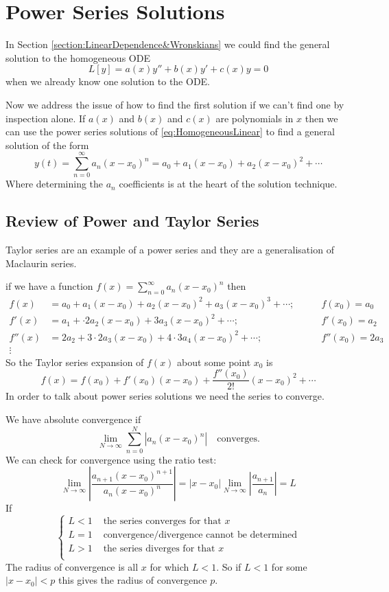\documentclass{article}
\theoremstyle{plain}
\theoremstyle{definition}
\numberwithin{equation}{section}
\begin{document}
\section{Power Series Solutions}

In Section \ref{section:LinearDependence&Wronskians} we could find the general solution to the homogeneous ODE
\begin{equation}\label{eq:HomogeneousLinear}
    L[y] = a(x)y'' + b(x)y' + c(x)y = 0
\end{equation}
when we already know one solution to the ODE.

Now we address the issue of how to find the first solution if we can't find one by inspection alone. If $a(x)$ and $b(x)$ and $c(x)$ are polynomials in $x$ then we can use the power series solutions of \eqref{eq:HomogeneousLinear} to find a general solution of the form
\[
    y(t) = \sum_{n=0}^{\infty}a_n (x-x_0)^n = a_0 + a_1(x-x_0) + a_2(x-x_0)^2 + \cdots
\]
Where determining the $a_n$ coefficients is at the heart of the solution technique.

\subsection{Review of Power and Taylor Series}

Taylor series are an example of a power series and they are a generalisation of Maclaurin series.

if we have a function $f(x) = \sum_{n=0}^{\infty} a_n(x-x_0)^n$ then
\begin{align*}
    f(x) &= a_0 + a_1(x-x_0) + a_2(x-x_0)^2 + a_3(x-x_0)^3 + \cdots; &\qquad f(x_0) = a_0 \\
    f'(x) &= a_1 + \cdot2 a_2(x-x_0) + 3 a_3(x-x_0)^2 + \cdots; &\qquad f'(x_0) = a_2 \\
    f''(x) &= 2a_2 + 3\cdot2 a_3(x-x_0) + 4\cdot3 a_4(x-x_0)^2 + \cdots; &\qquad f''(x_0) = 2a_3 \\
    \vdots
\end{align*}
So the Taylor series expansion of $f(x)$ about some point $x_0$ is $$f(x)=f(x_0) + f'(x_0)(x-x_0) + \frac{f''(x_0)}{2!} (x-x_0)^2 + \cdots$$
In order to talk about power series solutions we need the series to converge.

We have absolute convergence if
\[
\lim_{N\to \infty} \sum_{n=0}^{N} \left\vert a_n(x-x_0)^n \right\vert \quad \text{converges.}
\]
We can check for convergence using the ratio test:
\[
\lim_{N\to \infty} \left\vert \frac{a_{n+1} (x-x_0)^{n+1}}{a_n(x-x_0)^n} \right\vert = \vert x-x_0 \vert \lim_{N\to \infty} \left\vert \frac{a_{n+1}}{a_n} \right\vert = L
\]
If
\[
\begin{cases}
    L < 1 & \text{ the series converges for that $x$} \\
    L = 1 & \text{ convergence/divergence cannot be determined} \\
    L > 1 & \text{ the series diverges for that $x$} \\
\end{cases}
\]
The radius of convergence is all $x$ for which $L<1$. So if $L<1$ for some $\vert x - x_0 \vert < p$ this gives the radius of convergence $p$.
\end{document}
